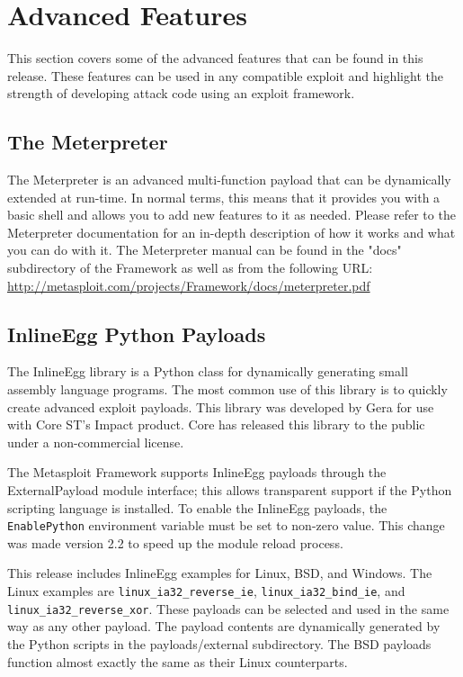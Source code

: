 \documentclass{report}
\begin{document}
\pagebreak
\chapter{Advanced Features}

\par
This section covers some of the advanced features that can be found in this
release. These features can be used in any compatible exploit and highlight the
strength of developing attack code using an exploit framework. 

\section{The Meterpreter}
\par
The Meterpreter is an advanced multi-function payload that can be dynamically
extended at run-time. In normal terms, this means that it provides you with a
basic shell and allows you to add new features to it as needed. Please refer to
the Meterpreter documentation for an in-depth description of how it works and
what you can do with it. The Meterpreter manual can be found in the "docs"
subdirectory of the Framework as well as from the following URL:
\url{http://metasploit.com/projects/Framework/docs/meterpreter.pdf}


\section{InlineEgg Python Payloads}
\par
The InlineEgg library is a Python class for dynamically generating small
assembly language programs. The most common use of this library is to quickly
create advanced exploit payloads. This library was developed by Gera for use
with Core ST's Impact product. Core has released this library to the public
under a non-commercial license. 

\par
The Metasploit Framework supports InlineEgg payloads through the ExternalPayload
module interface; this allows transparent support if the Python scripting
language is installed. To enable the InlineEgg payloads, the
\texttt{EnablePython} environment variable must be set to non-zero value. This
change was made version 2.2 to speed up the module reload process. 

\par
This release includes InlineEgg examples for Linux, BSD, and Windows. The Linux
examples are \texttt{linux\_ia32\_reverse\_ie}, \texttt{linux\_ia32\_bind\_ie}, and
\texttt{linux\_ia32\_reverse\_xor}. These payloads can be selected and used in the same
way as any other payload. The payload contents are dynamically generated by the
Python scripts in the payloads/external subdirectory. The BSD payloads function
almost exactly the same as their Linux counterparts. 
\end{document}

